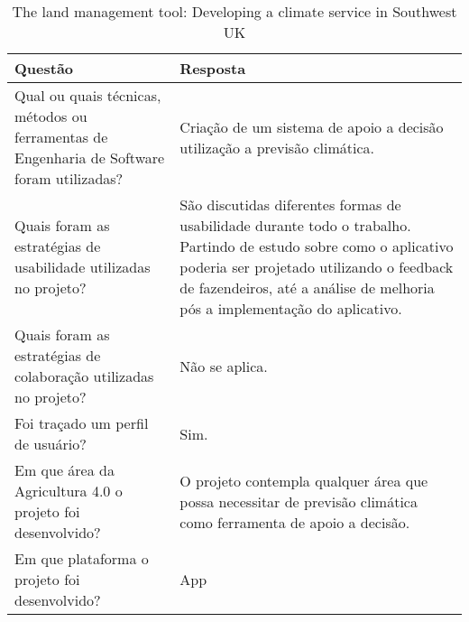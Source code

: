 \documentclass[12pt]{article}
\begin{document}
\begin{table}[!htb]
	\footnotesize
  \centering
	\begin{tabular}{|p{8cm}|p{6cm}|}
		\hline
		\textbf{Questão}                                                                           & \textbf{Resposta}                                                      \\ \hline
		Qual ou quais técnicas, métodos ou ferramentas de Engenharia de Software foram utilizadas? & Criação de um sistema de apoio a decisão utilização a previsão climática. \\ \hline
		Quais foram as estratégias de usabilidade utilizadas no projeto?                           & São discutidas diferentes formas de usabilidade durante todo o trabalho. Partindo de estudo sobre como o aplicativo poderia ser projetado utilizando o feedback de fazendeiros, até a análise de melhoria pós a implementação do aplicativo.                                   \\ \hline
		Quais foram as estratégias de colaboração utilizadas no projeto?                           & Não se aplica.                                 \\ \hline
		Foi traçado um perfil de usuário?                                                          & Sim.                                                                \\ \hline
		Em que área da Agricultura 4.0 o projeto foi desenvolvido?                                 & O projeto contempla qualquer área que possa necessitar de previsão climática como ferramenta de apoio a decisão.                                    \\ \hline
		Em que plataforma o projeto foi desenvolvido?                                              & App                                 \\ \hline
		\end{tabular}
  \caption{The land management tool: Developing a climate service in Southwest UK}
  \label{tab:extracao5}
\end{table}

% 
% 
\end{document}
